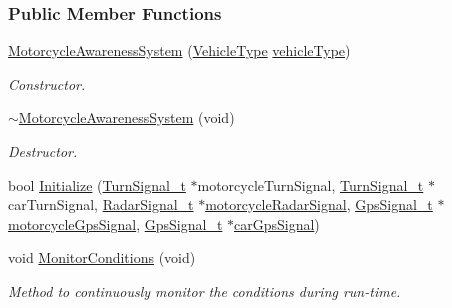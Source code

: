 \subsubsection*{Public Member Functions}
\begin{DoxyCompactItemize}
\item 
\hyperlink{classMotorcycleAwarenessSystem_ab0fb3823809dc056fecc82cc72a80a55}{Motorcycle\-Awareness\-System} (\hyperlink{MotorcycleAwarenessSystemTypes_8hpp_a0c05c42b98a847f971385c81c2a81afa}{Vehicle\-Type} \hyperlink{classMotorcycleAwarenessSystem_a977b2085bfbf6a62902bf2d80160e6d2}{vehicle\-Type})
\begin{DoxyCompactList}\small\item\em Constructor. \end{DoxyCompactList}\item 
\hyperlink{classMotorcycleAwarenessSystem_a89ce16a722b3575e1415cbe9c7eedbd3}{$\sim$\-Motorcycle\-Awareness\-System} (void)
\begin{DoxyCompactList}\small\item\em Destructor. \end{DoxyCompactList}\item 
bool \hyperlink{classMotorcycleAwarenessSystem_a341f27867c8d6aa0865040279ee246a9}{Initialize} (\hyperlink{structTurnSignal__t}{Turn\-Signal\-\_\-t} $\ast$motorcycle\-Turn\-Signal, \hyperlink{structTurnSignal__t}{Turn\-Signal\-\_\-t} $\ast$car\-Turn\-Signal, \hyperlink{structRadarSignal__t}{Radar\-Signal\-\_\-t} $\ast$\hyperlink{classMotorcycleAwarenessSystem_a0744e71b9f440a86f5078c876ba7629b}{motorcycle\-Radar\-Signal}, \hyperlink{structGpsSignal__t}{Gps\-Signal\-\_\-t} $\ast$\hyperlink{classMotorcycleAwarenessSystem_ab281a3993b574923b2f379ed0477b2d4}{motorcycle\-Gps\-Signal}, \hyperlink{structGpsSignal__t}{Gps\-Signal\-\_\-t} $\ast$\hyperlink{classMotorcycleAwarenessSystem_a9a8185e00b60d0be58bfa76166063128}{car\-Gps\-Signal})
\item 
void \hyperlink{classMotorcycleAwarenessSystem_afb19e832c17d43941d9ed6c4f4435a2e}{Monitor\-Conditions} (void)
\begin{DoxyCompactList}\small\item\em Method to continuously monitor the conditions during run-\/time. \end{DoxyCompactList}\end{DoxyCompactItemize}
